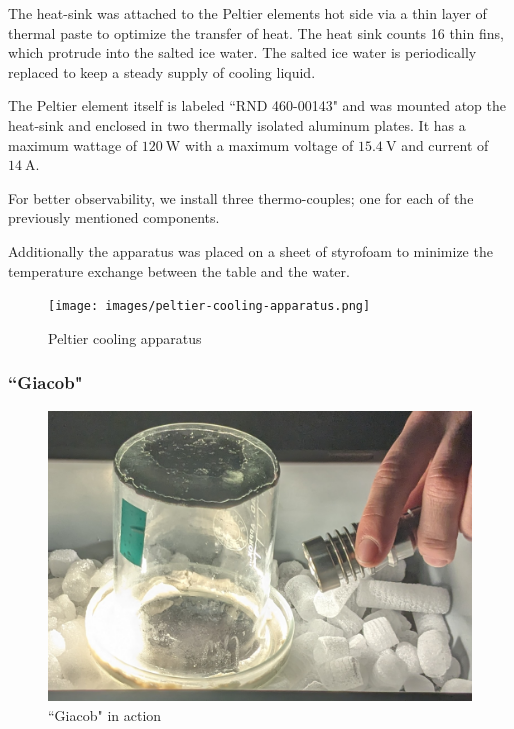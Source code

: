 \documentclass[10pt,a4paper]{article}
\begin{document}
The heat-sink was attached to the Peltier elements hot side via a thin layer of thermal paste to optimize the transfer of heat. The heat sink counts 16 thin fins, which protrude into the salted ice water. The salted ice water is periodically replaced to keep a steady supply of cooling liquid.

The Peltier element itself is labeled ``RND 460-00143" and was mounted atop the heat-sink and enclosed in two thermally isolated aluminum plates. It has a maximum wattage of \(\qty{120}{\watt}\) with a maximum voltage of \(\qty{15.4}{\volt}\) and current of \(\qty{14}{\ampere}\).

For better observability, we install three thermo-couples; one for each of the previously mentioned components.

Additionally the apparatus was placed on a sheet of styrofoam to minimize the temperature exchange between the table and the water.

\begin{figure}
    \centering
    \texttt{[image: images/peltier-cooling-apparatus.png]}
    \caption{Peltier cooling apparatus}
    \label{fig:peltier cooling apparaturs}
\end{figure}


\subsubsection{``Giacob"}

\begin{figure}
    \vspace{-\baselineskip}
    \includegraphics[width=1\linewidth]{images/giacob.png}
    \caption{``Giacob" in action}
    \label{fig:giacob}
\end{figure}
\end{document}
